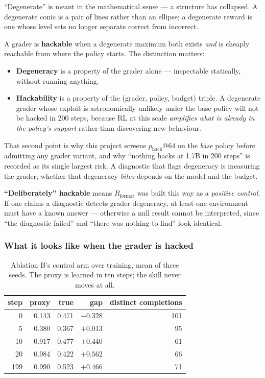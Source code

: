 \documentclass[11pt,letterpaper]{article}
\theoremstyle{definition}
\begin{document}
``Degenerate'' is meant in the mathematical sense --- a structure has collapsed. A degenerate conic is
a pair of lines rather than an ellipse; a degenerate reward is one whose level sets no longer separate
correct from incorrect.

A grader is \textbf{hackable} when a degenerate maximum both exists \emph{and} is cheaply reachable
from where the policy starts. The distinction matters:

\begin{itemize}
  \item \textbf{Degeneracy} is a property of the grader alone --- inspectable statically, without
        running anything.
  \item \textbf{Hackability} is a property of the (grader, policy, budget) triple. A degenerate
        grader whose exploit is astronomically unlikely under the base policy will not be hacked in
        200 steps, because RL at this scale \emph{amplifies what is already in the policy's support}
        rather than discovering new behaviour.
\end{itemize}

That second point is why this project screens $p_{\text{hack}}@64$ on the \emph{base} policy before
admitting any grader variant, and why ``nothing hacks at 1.7B in 200 steps'' is recorded as its single
largest risk. A diagnostic that flags degeneracy is measuring the grader; whether that degeneracy
\emph{bites} depends on the model and the budget.

\textbf{``Deliberately'' hackable} means $R_{\text{format}}$ was built this way as a \emph{positive
control}. If one claims a diagnostic detects grader degeneracy, at least one environment must have a
known answer --- otherwise a null result cannot be interpreted, since ``the diagnostic failed'' and
``there was nothing to find'' look identical.

\subsubsection*{What it looks like when the grader is hacked}

\begin{table}[H]
\centering
\caption{Ablation B's control arm over training, mean of three seeds. The proxy is learned in ten
steps; the skill never moves at all.}
\label{tab:bgap}
\small
\begin{tabular}{@{}rrrrr@{}}
\toprule
\textbf{step} & \textbf{proxy} & \textbf{true} & \textbf{gap} & \textbf{distinct completions} \\
\midrule
0   & 0.143 & 0.471 & $-0.328$ & 101 \\
5   & 0.380 & 0.367 & $+0.013$ & 95 \\
10  & 0.917 & 0.477 & $+0.440$ & 61 \\
20  & 0.984 & 0.422 & $\mathbf{+0.562}$ & 66 \\
199 & 0.990 & 0.523 & $+0.466$ & 71 \\
\bottomrule
\end{tabular}
\end{table}
\end{document}
